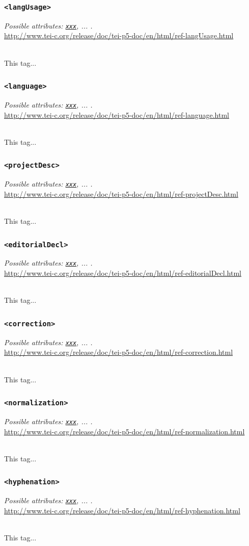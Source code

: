 \documentclass[12pt,a4paper]{article}
\newcommand{\taglinks}[2]{
\vspace*{-0.5ex}
\hspace*{\parindent}
\begin{minipage}{\textwidth}
  \emph{Possible attributes: #1.} \\ \url{#2} \end{minipage} \vspace{0.5ex} \\ }
\begin{document}
\subsubsection{\texttt{<langUsage>}} \label{tag-sec:langUsage}
\taglinks{
\hyperref[att-sec:xxx]{\texttt{xxx}}, ... }
{http://www.tei-c.org/release/doc/tei-p5-doc/en/html/ref-langUsage.html}
This tag...

\subsubsection{\texttt{<language>}} \label{tag-sec:language}
\taglinks{
\hyperref[att-sec:xxx]{\texttt{xxx}}, ... }
{http://www.tei-c.org/release/doc/tei-p5-doc/en/html/ref-language.html}
This tag...

\subsubsection{\texttt{<projectDesc>}} \label{tag-sec:projectDesc}
\taglinks{
\hyperref[att-sec:xxx]{\texttt{xxx}}, ... }
{http://www.tei-c.org/release/doc/tei-p5-doc/en/html/ref-projectDesc.html}
This tag...

\subsubsection{\texttt{<editorialDecl>}} \label{tag-sec:editorialDecl}
\taglinks{
\hyperref[att-sec:xxx]{\texttt{xxx}}, ... }
{http://www.tei-c.org/release/doc/tei-p5-doc/en/html/ref-editorialDecl.html}
This tag...

\subsubsection{\texttt{<correction>}} \label{tag-sec:correction}
\taglinks{
\hyperref[att-sec:xxx]{\texttt{xxx}}, ... }
{http://www.tei-c.org/release/doc/tei-p5-doc/en/html/ref-correction.html}
This tag...

\subsubsection{\texttt{<normalization>}} \label{tag-sec:normalization}
\taglinks{
\hyperref[att-sec:xxx]{\texttt{xxx}}, ... }
{http://www.tei-c.org/release/doc/tei-p5-doc/en/html/ref-normalization.html}
This tag...

\subsubsection{\texttt{<hyphenation>}} \label{tag-sec:hyphenation}
\taglinks{
\hyperref[att-sec:xxx]{\texttt{xxx}}, ... }
{http://www.tei-c.org/release/doc/tei-p5-doc/en/html/ref-hyphenation.html}
This tag...
\end{document}
